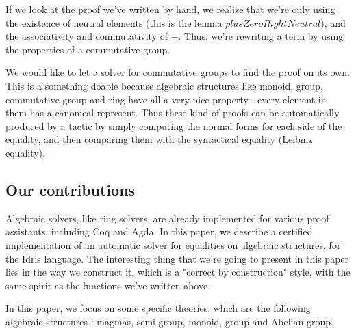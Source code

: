 If we look at the proof we've written by hand, we realize that we're only using the existence of neutral elements (this is the lemma $plusZeroRightNeutral$), and the associativity and commutativity of $+$. Thus, we're rewriting a term by using the properties of a commutative group.

We would like to let a solver for commutative groups to find the proof on its own.
This is a something doable because algebraic structures like monoid, group, commutative group and ring have all a very nice property : every element in them has a canonical represent. Thus these kind of proofs can be automatically produced by a tactic by simply computing the normal forms for each side of the equality, and then comparing them with the syntactical equality (Leibniz equality).

\subsection{Our contributions}

Algebraic solvers, like ring solvers, are already implemented for various proof assistants, including Coq and Agda. In this paper, we describe a certified implementation of an automatic solver for equalities on algebraic structures, for the Idris language. The interesting thing that we're going to present in this paper lies in the way we construct it, which is a "correct by construction" style, with the same spirit as the functions we've written above.

In this paper, we focus on some specific theories, which are the following algebraic structures : magmas, semi-group, monoid, group and Abelian group.

